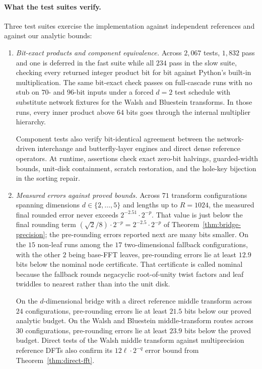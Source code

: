 \paragraph{What the test suites verify.}
Three test suites exercise the implementation against independent references and against our analytic bounds:
\begin{enumerate}[label=(\arabic*),leftmargin=*,itemsep=2pt]
\item \emph{Bit-exact products and component equivalence.} Across $2{,}067$ tests, $1{,}832$ pass and one is deferred in the fast suite while all $234$ pass in the slow suite, checking every returned integer product bit for bit against Python's built-in multiplication. The same bit-exact check passes on full-cascade runs with no stub on $70$- and $96$-bit inputs under a forced $d=2$ test schedule with substitute network fixtures for the Walsh and Bluestein transforms. In those runs, every inner product above $64$ bits goes through the internal multiplier hierarchy.

Component tests also verify bit-identical agreement between the network-driven interchange and butterfly-layer engines and direct dense reference operators. At runtime, assertions check exact zero-bit halvings, guarded-width bounds, unit-disk containment, scratch restoration, and the hole-key bijection in the sorting repair.

\item \emph{Measured errors against proved bounds.} Across $71$ transform configurations spanning dimensions $d\in\{2,\dots,5\}$ and lengths up to $R=1024$, the measured final rounded error never exceeds $2^{-2.51}\cdot2^{-p}$. That value is just below the final rounding term $(\sqrt2/8)\cdot2^{-p}=2^{-2.5}\cdot2^{-p}$ of Theorem~\ref{thm:bridge-precision}; the pre-rounding errors reported next are many bits smaller. On the $15$ non-leaf runs among the $17$ two-dimensional fallback configurations, with the other $2$ being base-FFT leaves, pre-rounding errors lie at least $12.9$ bits below the nominal node certificate. That certificate is called nominal because the fallback rounds negacyclic root-of-unity twist factors and leaf twiddles to nearest rather than into the unit disk.

On the $d$-dimensional bridge with a direct reference middle transform across $24$ configurations, pre-rounding errors lie at least $21.5$ bits below our proved analytic budget. On the Walsh and Bluestein middle-transform routes across $30$ configurations, pre-rounding errors lie at least $23.9$ bits below the proved budget. Direct tests of the Walsh middle transform against multiprecision reference DFTs also confirm its $12\ell\cdot2^{-q}$ error bound from Theorem~\ref{thm:direct-fft}.


\end{enumerate}
